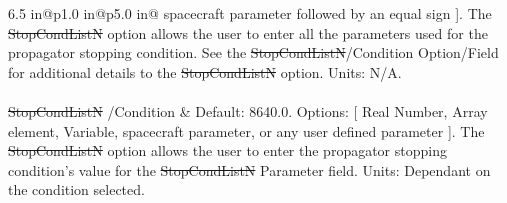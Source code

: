 \begin{supertabular*}{6.5 in}{@{}p{1.0 in}@{\extracolsep{\fill}}p{5.0 in}@{}}
    spacecraft parameter followed by an equal sign ]. The
    \st{StopCondListN} option allows the user to enter all the parameters used for the propagator stopping condition.
    See the \st{StopCondListN}/Condition Option/Field for additional details to the \st{StopCondListN} option.
    Units: N/A. \\\\
    \st{StopCondListN} /Condition & Default: 8640.0. Options: [ Real Number, Array element, Variable, spacecraft
    parameter, or any user defined parameter ].
    The \st{StopCondListN} option allows the user to enter the propagator stopping condition's value for the
    \st{StopCondListN} Parameter field. Units: Dependant on the condition selected. \\\\

    \hline\hline
    \\
    \hline
    \\
    \\
    \\\\

    \\
    \\
    \\\\

    \\
    \\\\

    \\
    \\\\

    \\
    \\\\


\end{supertabular*}
